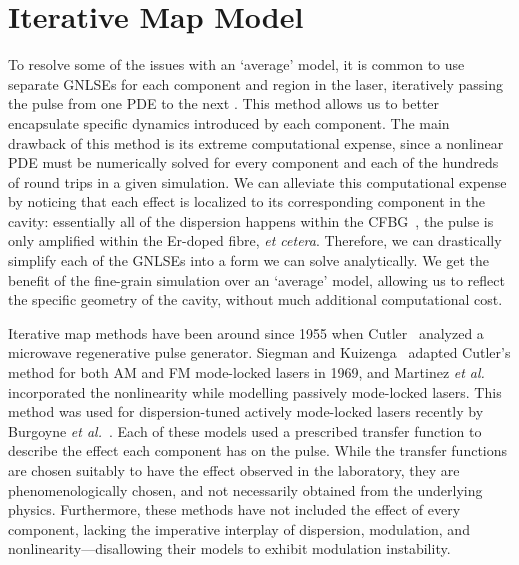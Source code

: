 \documentclass[9pt,twocolumn,twoside]{osajnl}
\begin{document}
\section{Iterative Map Model}
\label{sec:model}
To resolve some of the issues with an `average' model, it is common to use separate GNLSEs for each component and region in the laser, iteratively passing the pulse from one PDE to the next \cite{lapre2019, meng2020, oktem2010, woodward2018}. This method allows us to better encapsulate specific dynamics introduced by each component. The main drawback of this method is its extreme computational expense, since a nonlinear PDE must be numerically solved for every component and each of the hundreds of round trips in a given simulation. We can alleviate this computational expense by noticing that each effect is localized to its corresponding component in the cavity: essentially all of the dispersion happens within the CFBG~\cite{agrawal2002}, the pulse is only amplified within the Er-doped fibre, \emph{et cetera}. Therefore, we can drastically simplify each of the GNLSEs into a form we can solve analytically. We get the benefit of the fine-grain simulation over an `average' model, allowing us to reflect the specific geometry of the cavity, without much additional computational cost.

Iterative map methods have been around since 1955 when Cutler~\cite{cutler1955} analyzed a microwave regenerative pulse generator. Siegman and Kuizenga~\cite{kuizenga1970a, kuizenga1970b, kuizenga1970, siegman1969} adapted Cutler's method for both AM and FM mode-locked lasers in 1969, and Martinez \emph{et al.}~\cite{martinez1984, martinez1985} incorporated the nonlinearity while modelling passively mode-locked lasers. This method was used for dispersion-tuned actively mode-locked lasers recently by Burgoyne \emph{et al.}~\cite{burgoyne2014}. Each of these models used a prescribed transfer function to describe the effect each component has on the pulse. While the transfer functions are chosen suitably to have the effect observed in the laboratory, they are phenomenologically chosen, and not necessarily obtained from the underlying physics. Furthermore, these methods have not included the effect of every component, lacking the imperative interplay of dispersion, modulation, and nonlinearity---disallowing their models to exhibit modulation instability.
\end{document}
